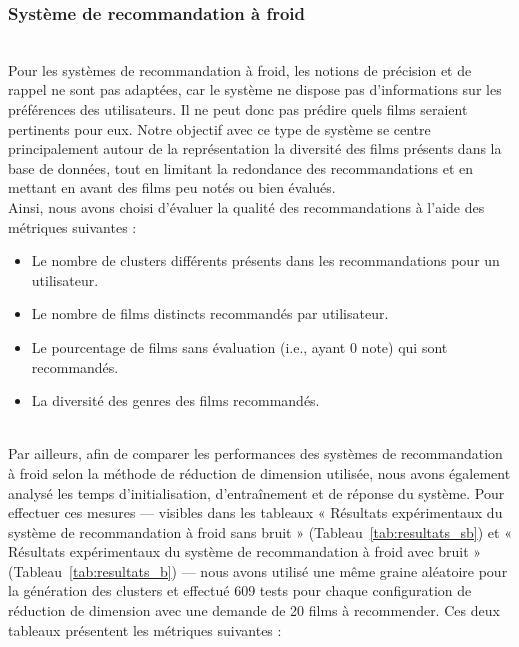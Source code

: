 \documentclass{article}
\begin{document}
\subsubsection{Système de recommandation à froid}
$ $\\
Pour les systèmes de recommandation à froid, les notions de précision et de rappel ne sont pas adaptées,
car le système ne dispose pas d'informations sur les préférences des utilisateurs. Il ne peut donc pas
prédire quels films seraient pertinents pour eux. Notre objectif avec ce type de système se centre principalement
autour de la représentation la diversité des films présents dans la base de données, tout en limitant la
redondance des recommandations et en mettant en avant des films peu notés ou bien évalués.\\
Ainsi, nous avons choisi d'évaluer la qualité des recommandations à l'aide des métriques suivantes :\\
\begin{itemize}
    \item Le nombre de clusters différents présents dans les recommandations pour un utilisateur.
    \item Le nombre de films distincts recommandés par utilisateur.
    \item Le pourcentage de films sans évaluation (i.e., ayant 0 note) qui sont recommandés.
    \item La diversité des genres des films recommandés.
\end{itemize}
$ $\\
Par ailleurs, afin de comparer les performances des systèmes de recommandation à froid selon la méthode de
réduction de dimension utilisée, nous avons également analysé les temps d’initialisation, d’entraînement
et de réponse du système. Pour effectuer ces mesures — visibles dans les tableaux « Résultats expérimentaux
du système de recommandation à froid sans bruit » (Tableau~\ref{tab:resultats_sb}) et « Résultats expérimentaux
du système de recommandation à froid avec bruit » (Tableau~\ref{tab:resultats_b}) — nous avons utilisé une même
graine aléatoire pour la génération des clusters et effectué 609 tests pour chaque configuration de réduction de dimension avec une demande de 20 films à recommender.
Ces deux tableaux présentent les métriques suivantes :\\
\end{document}
